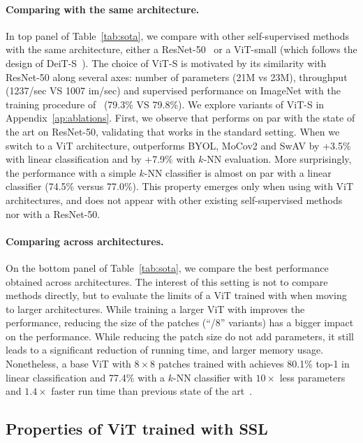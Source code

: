 \paragraph{Comparing with the same architecture.}
In top panel of Table~\ref{tab:sota}, we compare \OURS with other self-supervised methods with the same architecture, either a ResNet-50~\cite{he2016deep} or a ViT-small (which follows the design of DeiT-S~\cite{touvron2020training}).
The choice of ViT-S is motivated by its similarity with ResNet-50 along several axes: number of parameters (21M vs 23M), throughput (1237/sec VS 1007 im/sec) and supervised performance on ImageNet with the training procedure of~\cite{touvron2020training} (79.3\% VS 79.8\%).
We explore variants of ViT-S in Appendix~\ref{ap:ablations}.
First, we observe that \OURS performs on par with the state of the art on ResNet-50, validating that \OURS works in the standard setting.
When we switch to a ViT architecture, \OURS outperforms BYOL, MoCov2 and SwAV by +3.5\% with linear classification and by +7.9\% with $k$-NN evaluation.
More surprisingly, the performance with a simple $k$-NN classifier is almost on par with a linear classifier (74.5\% versus 77.0\%).
This property emerges only when using \OURS with ViT architectures, and does not appear with other existing self-supervised methods nor with a ResNet-50.

\paragraph{Comparing across architectures.}
On the bottom panel of Table~\ref{tab:sota}, we compare the best performance obtained across architectures.
The interest of this setting is not to compare methods directly, but to evaluate the limits of a ViT trained with \OURS when moving to larger architectures.
While training a larger ViT with \OURS improves the performance, reducing the size of the patches (``/8'' variants) has a bigger impact on the performance.
While reducing the patch size do not add parameters, it still leads to a significant reduction of running time, and larger memory usage.
Nonetheless, a base ViT with $8\times 8$ patches trained with \OURS achieves 80.1\% top-1 in linear classification and 77.4\% with a $k$-NN classifier with $10\times$ less parameters and $1.4\times$ faster run time than previous state of the art~\cite{chen2020big}.


\subsection{Properties of ViT trained with SSL}

